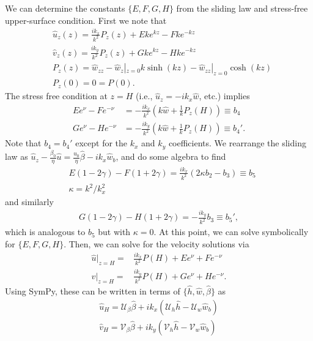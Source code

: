 \documentclass[paper=a4, fontsize=11pt]{article}
\begin{document}
We can determine the constants $\{E,F,G,H\}$ from the sliding law and stress-free
upper-surface condition.
First we note that
\begin{align}
&\widehat{u}_z(z) = \frac{ik_x }{k^2} P_z(z)
+ E k e^{kz} - F k e^{-kz} \\
&\widehat{v}_z(z) = \frac{ik_y }{k^2} P_z(z) + G k  e^{kz} - H k e^{-kz} \\
&P_z(z) = \widehat{w}_{zz}-\widehat{w}_z|_{z=0}k\sinh(kz) - \widehat{w}_{zz}|_{z=0}\cosh(kz)\\
&P_z(0) = 0 = P(0).
\end{align}
The stress free condition at $z=H$ (i.e., $\widehat{u}_z = -ik_x \widehat{w}$, etc.)
implies
\begin{align}
 E  e^{\nu} - F  e^{-\nu} &= -\frac{ik_x}{k^2} \left(k\widehat{w}+\frac{1}{k}P_{z}(H)\right)\equiv b_4 \\
  G  e^{\nu} - H  e^{-\nu} &= -\frac{ik_y}{k^2} \left(k\widehat{w}+\frac{1}{k}P_{z}(H)\right) \equiv b_4'.
\end{align}
Note that $b_4=b_4'$ except for the $k_x$ and $k_y$ coefficients.
We rearrange the sliding law as $\widehat{u}_z - \frac{\beta_0}{\eta}\widehat{u}=\frac{u_0}{\eta}\widehat{\beta}
-ik_x\widehat{w}_b$, and do some algebra to find
\begin{align}
&E (1-2\gamma) - F (1+2\gamma) =
\frac{ik_x}{k^2}\left(2\kappa b_2 - b_3 \right)  \equiv b_5 \\
&\kappa = {k}^2/k_x^2
\end{align}
and similarly
\begin{align}
G (1-2\gamma) -H (1+2\gamma) = -\frac{ik_y}{k^2}b_3 \equiv b_5',
\end{align}
which is analogous to $b_5$ but with $\kappa=0$.
At this point, we can solve symbolically for $\{E,F,G,H\}$.
Then, we can solve for the velocity solutions via
\begin{align}
\widehat{u}|_{z=H} =&  \frac{ik_x }{k^2} P(H) + E e^{\nu} + F e^{-\nu}  \\
\widehat{v}|_{z=H} =& \frac{ik_y }{k^2} P(H)+ G e^{\nu} + H e^{-\nu}.
\end{align}
Using SymPy, these can be written in terms of $\{\widehat{h},\widehat{w},\widehat{\beta}\}$ as
\begin{align}
\widehat{u}_H =    \mathcal{U}_{\beta} \widehat{\beta} +ik_x\left(\mathcal{U}_h\widehat{h} -  \mathcal{U}_w\widehat{w}_b\right) \label{uH}\\
\widehat{v}_H =  \mathcal{V}_{\beta} \widehat{\beta}+ik_y\left(\mathcal{V}_h\widehat{h} -  \mathcal{V}_w\widehat{w}_b\right)\label{vH}
\end{align}
\end{document}

